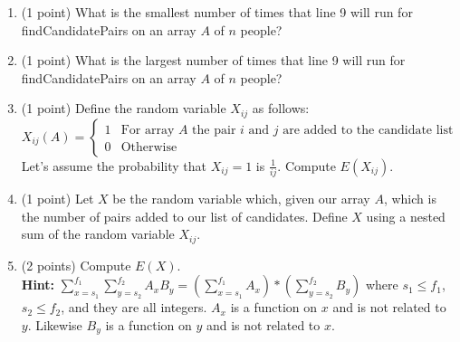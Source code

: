 \documentclass[12pt]{elsart}
\begin{document}
\begin{enumerate}
 \item (1 point) What is the smallest number of times that line 9 will run for findCandidatePairs on an array $A$ of $n$ people?  
 \item (1 point) What is the largest number of times that line 9 will run for findCandidatePairs on an array $A$ of $n$ people?   
 \item (1 point) Define the random variable $X_{ij}$ as follows:
\[
 X_{ij}(A)= \begin{cases} 
      1 & \text{For array $A$ the pair $i$ and $j$ are added to the candidate list} \\
      0 & \text{Otherwise}
   \end{cases}
   \]
 Let's assume the probability that $X_{ij}=1$ is $\frac{1}{ij}$. Compute $E(X_{ij})$.
 \item (1 point) Let $X$ be the random variable which, given our array $A$, which is the number of pairs added to our list of candidates.  Define $X$ using a nested sum of the random variable $X_{ij}$.
 \item (2 points) Compute $E(X)$.\\
{\bf Hint:} $\sum\limits_{x=s_1}^{f_1}\sum\limits_{y=s_2}^{f_2}A_xB_y=\left(\sum\limits_{x=s_1}^{f_1} A_x\right)*\left(\sum\limits_{y=s_2}^{f_2}B_y\right)$ where $s_1\leq f_1$, $s_2 \leq f_2$, and they are all integers.  $A_x$ is a function on $x$ and is not related to $y$.  Likewise $B_y$ is a function on $y$ and is not related to $x$.  
\end{enumerate}
\end{document}

